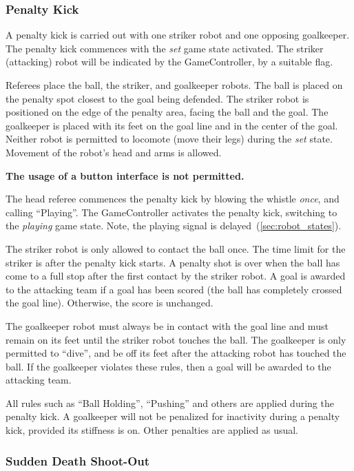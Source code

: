 \subsubsection{Penalty Kick}
\label{sec:penalty_kick}

A penalty kick is carried out with one striker robot and one opposing goalkeeper.
The penalty kick commences with the \textit{set} game state activated.
The striker (attacking) robot will be indicated by the GameController, by a suitable flag.

Referees place the ball, the striker, and goalkeeper robots. The ball is placed on the penalty spot closest to the goal being defended. The striker robot is positioned on the edge of the penalty area, facing the ball and the goal. The goalkeeper is placed with its feet on the goal line and in the center of the goal. Neither robot is permitted to locomote (move their legs) during the \textit{set} state. Movement of the robot's head and arms is allowed.

\textbf{The usage of a button interface is not permitted.}

The head referee commences the penalty kick by blowing the whistle \textit{once}, and calling ``Playing''.
The GameController activates the penalty kick, switching to the \emph{playing} game state.
Note, the playing signal is delayed~(\cf \cref{sec:robot_states}).

The striker robot is only allowed to contact the ball once.
The time limit for the striker is \PenaltyKickTime after the penalty kick starts.
A penalty shot is over when the ball has come to a full stop after the first contact by the striker robot.
A goal is awarded to the attacking team if a goal has been scored (\ie the ball has completely crossed the goal line).
Otherwise, the score is unchanged.

The goalkeeper robot must always be in contact with the goal line and must remain on its feet until the striker robot touches the ball.
The goalkeeper is only permitted to ``dive'', and be off its feet after the attacking robot has touched the ball.
If the goalkeeper violates these rules, then a goal will be awarded to the attacking team.

All rules such as ``Ball Holding'', ``Pushing'' and others are applied during the penalty kick.
A goalkeeper will not be penalized for inactivity during a penalty kick, provided its stiffness is on.
Other penalties are applied as usual.

\subsubsection{Sudden Death Shoot-Out}
\label{sec:sudden_death_shoot_out}

